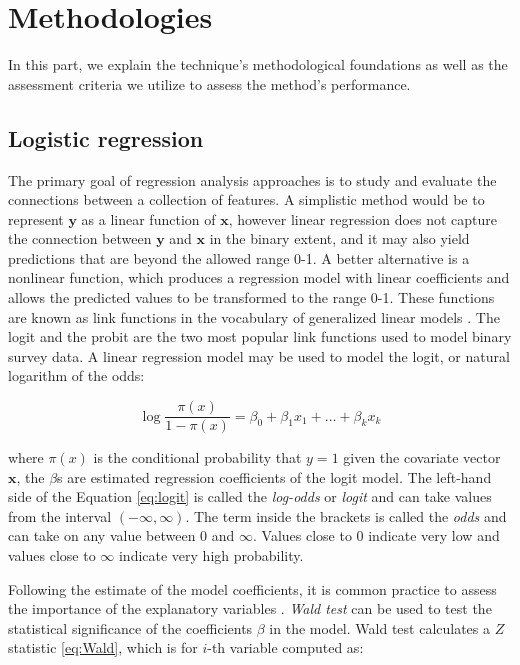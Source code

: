 \hypertarget{id}{%
\section{Methodologies}\label{id}}

In this part, we explain the technique's methodological foundations as
well as the assessment criteria we utilize to assess the method's
performance.

\hypertarget{logistic-regression}{%
\subsection{Logistic regression}\label{logistic-regression}}

The primary goal of regression analysis approaches is to study and
evaluate the connections between a collection of features. A simplistic
method would be to represent \(\mathbf{y}\) as a linear function of
\(\mathbf{x}\), however linear regression does not capture the
connection between \(\mathbf{y}\) and \(\mathbf{x}\) in the binary
extent, and it may also yield predictions that are beyond the allowed
range 0-1. A better alternative is a nonlinear function, which produces
a regression model with linear coefficients and allows the predicted
values to be transformed to the range 0-1. These functions are known as
link functions in the vocabulary of generalized linear models
\citep{Heeringa2010}. The logit and the probit are the two most popular
link functions used to model binary survey data. A linear regression
model may be used to model the logit, or natural logarithm of the odds:

\begin{equation}
\label{eq:logit}
\log \frac{\pi(x)}{1-\pi(x)} = \beta_0 +\beta_1 x_1 + \dots + \beta_kx_k
\end{equation}

where \(\pi(x)\) is the conditional probability that \(y=1\) given the
covariate vector \(\mathbf{x}\), the \(\beta\)s are estimated regression
coefficients of the logit model. The left-hand side of the Equation
\eqref{eq:logit} is called the \emph{log-odds} or \emph{logit} and can
take values from the interval \((-\infty, \infty)\). The term inside the
brackets is called the \emph{odds} and can take on any value between 0
and \(\infty\). Values close to 0 indicate very low and values close to
\(\infty\) indicate very high probability.

Following the estimate of the model coefficients, it is common practice
to assess the importance of the explanatory variables
\citep{Hosmer2013}. \emph{Wald test} can be used to test the statistical
significance of the coefficients \(\beta\) in the model. Wald test
calculates a \(Z\) statistic \eqref{eq:Wald}, which is for \(i\)-th
variable computed as:

